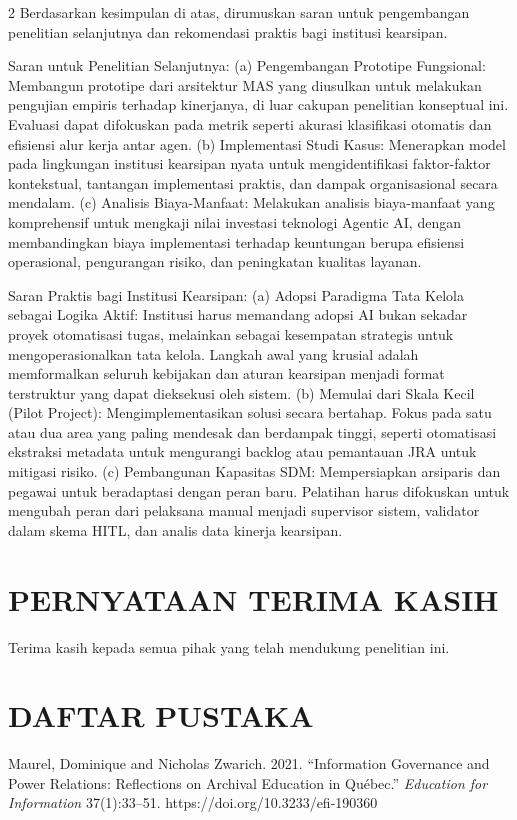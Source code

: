\documentclass[12pt,a4paper]{article}
\begin{document}
\begin{multicols}{2}
Berdasarkan kesimpulan di atas, dirumuskan saran untuk pengembangan penelitian selanjutnya dan rekomendasi praktis bagi institusi kearsipan.

Saran untuk Penelitian Selanjutnya: (a) Pengembangan Prototipe Fungsional: Membangun prototipe dari arsitektur MAS yang diusulkan untuk melakukan pengujian empiris terhadap kinerjanya, di luar cakupan penelitian konseptual ini. Evaluasi dapat difokuskan pada metrik seperti akurasi klasifikasi otomatis dan efisiensi alur kerja antar agen. (b) Implementasi Studi Kasus: Menerapkan model pada lingkungan institusi kearsipan nyata untuk mengidentifikasi faktor-faktor kontekstual, tantangan implementasi praktis, dan dampak organisasional secara mendalam. (c) Analisis Biaya-Manfaat: Melakukan analisis biaya-manfaat yang komprehensif untuk mengkaji nilai investasi teknologi Agentic AI, dengan membandingkan biaya implementasi terhadap keuntungan berupa efisiensi operasional, pengurangan risiko, dan peningkatan kualitas layanan.

Saran Praktis bagi Institusi Kearsipan: (a) Adopsi Paradigma Tata Kelola sebagai Logika Aktif: Institusi harus memandang adopsi AI bukan sekadar proyek otomatisasi tugas, melainkan sebagai kesempatan strategis untuk mengoperasionalkan tata kelola. Langkah awal yang krusial adalah memformalkan seluruh kebijakan dan aturan kearsipan menjadi format terstruktur yang dapat dieksekusi oleh sistem. (b) Memulai dari Skala Kecil (Pilot Project): Mengimplementasikan solusi secara bertahap. Fokus pada satu atau dua area yang paling mendesak dan berdampak tinggi, seperti otomatisasi ekstraksi metadata untuk mengurangi backlog atau pemantauan JRA untuk mitigasi risiko. (c) Pembangunan Kapasitas SDM: Mempersiapkan arsiparis dan pegawai untuk beradaptasi dengan peran baru. Pelatihan harus difokuskan untuk mengubah peran dari pelaksana manual menjadi supervisor sistem, validator dalam skema HITL, dan analis data kinerja kearsipan.

\section*{PERNYATAAN TERIMA KASIH}

Terima kasih kepada semua pihak yang telah mendukung penelitian ini.

\section*{DAFTAR PUSTAKA}

Maurel, Dominique and Nicholas Zwarich. 2021. ``Information Governance and Power Relations: Reflections on Archival Education in Québec.'' \emph{Education for Information} 37(1):33--51. https://doi.org/10.3233/efi-190360


\end{multicols}
\end{document}
